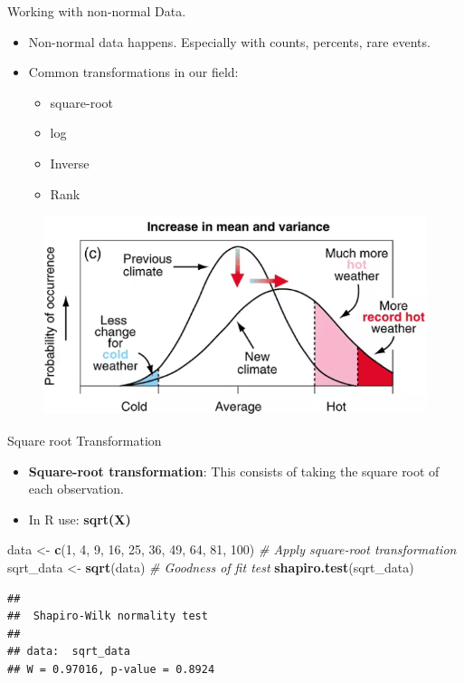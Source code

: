 \documentclass[
  ignorenonframetext,
]{beamer}
\newenvironment{Shaded}{\begin{snugshade}}{\end{snugshade}}
\newcommand{\CommentTok}[1]{\textcolor[rgb]{0.56,0.35,0.01}{\textit{#1}}}
\newcommand{\DecValTok}[1]{\textcolor[rgb]{0.00,0.00,0.81}{#1}}
\newcommand{\FunctionTok}[1]{\textcolor[rgb]{0.13,0.29,0.53}{\textbf{#1}}}
\newcommand{\NormalTok}[1]{#1}
\newcommand{\OtherTok}[1]{\textcolor[rgb]{0.56,0.35,0.01}{#1}}
\providecommand{\tightlist}{%
  \setlength{\itemsep}{0pt}\setlength{\parskip}{0pt}}
\begin{document}
\begin{frame}{Working with non-normal Data.}
\label{working-with-non-normal-data.-1}
\begin{itemize}
\item
  Non-normal data happens. Especially with counts, percents, rare
  events.
\item
  Common transformations in our field:

  \begin{itemize}
  \tightlist
  \item
    square-root
  \item
    log
  \item
    Inverse
  \item
    Rank
  \end{itemize}
\end{itemize}

\begin{figure}

\hfill{}\includegraphics[width=0.6\linewidth]{fig/climate3} 

\end{figure}
\end{frame}

\begin{frame}[fragile]{Square root Transformation}
\label{square-root-transformation}
\begin{itemize}
\item
  \textbf{Square-root transformation}: This consists of taking the
  square root of each observation.
\item
  In R use: \textbf{sqrt(X)}
\end{itemize}

\begin{Shaded}
\begin{Highlighting}[]
\NormalTok{data }\OtherTok{\textless{}{-}} \FunctionTok{c}\NormalTok{(}\DecValTok{1}\NormalTok{, }\DecValTok{4}\NormalTok{, }\DecValTok{9}\NormalTok{, }\DecValTok{16}\NormalTok{, }\DecValTok{25}\NormalTok{, }\DecValTok{36}\NormalTok{, }\DecValTok{49}\NormalTok{, }\DecValTok{64}\NormalTok{, }\DecValTok{81}\NormalTok{, }\DecValTok{100}\NormalTok{)}
\CommentTok{\# Apply square{-}root transformation}
\NormalTok{sqrt\_data }\OtherTok{\textless{}{-}} \FunctionTok{sqrt}\NormalTok{(data)}
\CommentTok{\# Goodness of fit test}
\FunctionTok{shapiro.test}\NormalTok{(sqrt\_data)}
\end{Highlighting}
\end{Shaded}

\begin{verbatim}
## 
##  Shapiro-Wilk normality test
## 
## data:  sqrt_data
## W = 0.97016, p-value = 0.8924
\end{verbatim}
\end{frame}
\end{document}
